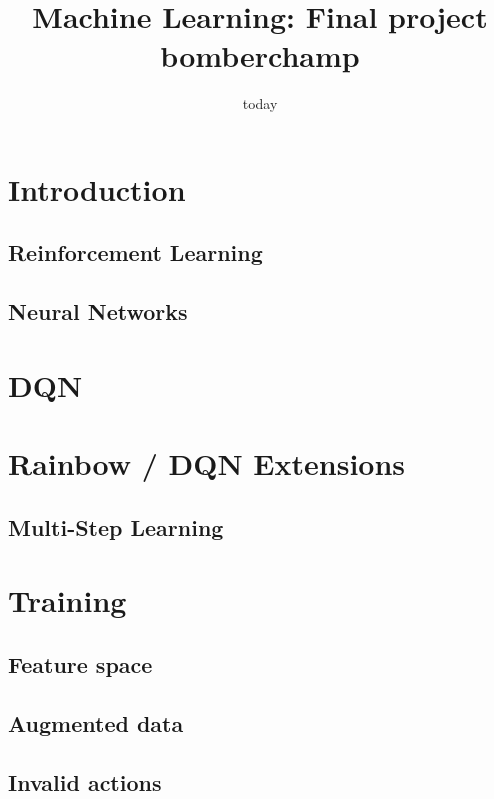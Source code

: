 \documentclass[12pt]{article}
\title{Machine Learning: Final project bomberchamp}
\date{today}
\begin{document}
\section{Introduction}


\subsection{Reinforcement Learning}

\subsection{Neural Networks}


\section{DQN}


\section{Rainbow / DQN Extensions}

\subsection{Multi-Step Learning} %
% 


\section{Training}
\subsection{Feature space}

\subsection{Augmented data}   %

\subsection{Invalid actions} %

\end{document}
